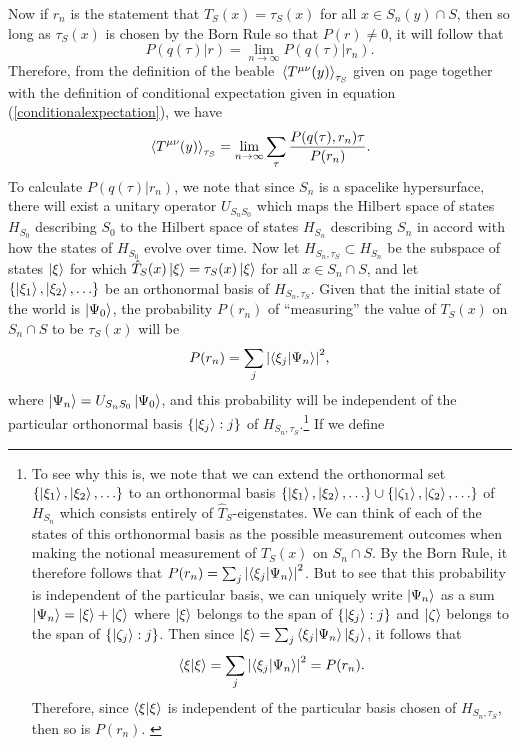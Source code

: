  
 Now if $r_n$ is the statement that  $T_S(x)=\tau_S(x)$ for all $x\in S_n(y)\cap S$, then so long as $\tau_S(x)$ is chosen by the Born Rule so that $P(r)\neq 0$, it will follow that
 \begin{equation}
	P(q(\tau)|r)=\lim_{n\rightarrow\infty}P(q(\tau)|r_n).
 \end{equation}
 Therefore, from the definition of the beable $\ev*{T^{\mu\nu}(y)}_{\tau_S}$ given on page \pageref{Kentbeable} together with the definition of conditional expectation given in equation (\ref{conditionalexpectation}), we have 
\begin{equation}\label{beable1}
\ev*{T^{\mu\nu}(y)}_{\tau_S}=\lim_{n\rightarrow\infty}\sum_\tau\frac{P(q(\tau),r_n)\tau}{P(r_n)}.
\end{equation} 
 To calculate $P(q(\tau)|r_n)$, we note that since $S_n$ is a spacelike hypersurface,   there will exist a unitary operator $U_{S_nS_0}$ which maps the Hilbert space of states $H_{S_0}$ describing $S_0$ to the Hilbert space of states $H_{S_n}$\label{HSidef} describing $S_n$ in accord with how the states of $H_{S_0}$  evolve over time. Now let $H_{S_n,\tau_S}\subset H_{S_n}$ be the subspace of states $\ket{\xi}$ for which  $\hat{T}_S(x)\ket{\xi}=\tau_S(x)\ket{\xi}$  for all $x\in S_n\cap S$, and  let $\{\ket{\xi_1},\ket{\xi_2},\ldots\}$ be an orthonormal basis of $H_{S_n,\tau_S}$. Given that the initial state of the world is $\ket{\Psi_0}$, the probability $P(r_n)$ of ``measuring'' the value of $T_S(x)$ on $S_n\cap S$ to be $\tau_S(x)$ will be 
\begin{equation}\label{Pri}
P(r_n)=\sum_j \abs{ \ip{\xi_j}{\Psi_n}}^2,
\end{equation}
where $\ket{\Psi_n}=U_{S_nS_0}\ket{\Psi_0}$, and this probability will be independent of the particular orthonormal basis  $\{\ket{\xi_j}:j\}$ of $H_{S_n,\tau_S}$.\footnote{To see why this is, we note that we can extend the orthonormal set $\{\ket{\xi_1},\ket{\xi_2},\ldots\}$ to an orthonormal basis  $\{\ket{\xi_1},\ket{\xi_2},\ldots\}\cup\{\ket{\zeta_1},\ket{\zeta_2},\ldots\}$ of $H_{S_n}$ which consists entirely of $\hat{T}_S$-eigenstates. We can think of each of the states of this orthonormal basis as the possible measurement outcomes when making the notional measurement of $T_S(x)$ on $S_n\cap S$. By the Born Rule, it therefore follows that $P(r_n)=\sum_j \abs{ \ip{\xi_j}{\Psi_n}}^2$. But to see that this probability is independent of the particular basis, we can uniquely write $\ket{\Psi_n}$ as a sum $\ket{\Psi_n}=\ket{\xi}+\ket{\zeta}$ where $\ket{\xi}$ belongs to the span of $\{\ket{\xi_j}:j\}$ and $\ket{\zeta}$ belongs to the span of $\{\ket{\zeta_j}:j\}$.  Then since $\ket{\xi}=\sum_j\ip{\xi_j}{\Psi_n}\ket{\xi_j}$, it follows that $$\ip{\xi}{\xi}=\sum_j\abs{ \ip{\xi_j}{\Psi_n}}^2=P(r_n).$$ Therefore, since  $\ip{\xi}{\xi}$ is independent of the particular basis chosen of $H_{S_n,\tau_S}$, then so is $P(r_n)$.  \label{priproof} } If we define 
